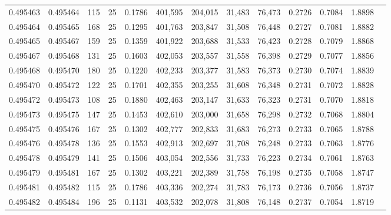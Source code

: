 \begin{tabular}{rrrrrrrrrrrrr}
0.495463 & 0.495464 &   115 &  25 &                                     0.1786 & 401,595 & 204,015 &  31,483 &  76,473 & 0.2726 & 0.7084 & 1.8898 \\
0.495464 & 0.495465 &   168 &  25 &                                     0.1295 & 401,763 & 203,847 &  31,508 &  76,448 & 0.2727 & 0.7081 & 1.8882 \\
0.495465 & 0.495467 &   159 &  25 &                                     0.1359 & 401,922 & 203,688 &  31,533 &  76,423 & 0.2728 & 0.7079 & 1.8868 \\
0.495467 & 0.495468 &   131 &  25 &                                     0.1603 & 402,053 & 203,557 &  31,558 &  76,398 & 0.2729 & 0.7077 & 1.8856 \\
0.495468 & 0.495470 &   180 &  25 &                                     0.1220 & 402,233 & 203,377 &  31,583 &  76,373 & 0.2730 & 0.7074 & 1.8839 \\
0.495470 & 0.495472 &   122 &  25 &                                     0.1701 & 402,355 & 203,255 &  31,608 &  76,348 & 0.2731 & 0.7072 & 1.8828 \\
0.495472 & 0.495473 &   108 &  25 &                                     0.1880 & 402,463 & 203,147 &  31,633 &  76,323 & 0.2731 & 0.7070 & 1.8818 \\
0.495473 & 0.495475 &   147 &  25 &                                     0.1453 & 402,610 & 203,000 &  31,658 &  76,298 & 0.2732 & 0.7068 & 1.8804 \\
0.495475 & 0.495476 &   167 &  25 &                                     0.1302 & 402,777 & 202,833 &  31,683 &  76,273 & 0.2733 & 0.7065 & 1.8788 \\
0.495476 & 0.495478 &   136 &  25 &                                     0.1553 & 402,913 & 202,697 &  31,708 &  76,248 & 0.2733 & 0.7063 & 1.8776 \\
0.495478 & 0.495479 &   141 &  25 &                                     0.1506 & 403,054 & 202,556 &  31,733 &  76,223 & 0.2734 & 0.7061 & 1.8763 \\
0.495479 & 0.495481 &   167 &  25 &                                     0.1302 & 403,221 & 202,389 &  31,758 &  76,198 & 0.2735 & 0.7058 & 1.8747 \\
0.495481 & 0.495482 &   115 &  25 &                                     0.1786 & 403,336 & 202,274 &  31,783 &  76,173 & 0.2736 & 0.7056 & 1.8737 \\
0.495482 & 0.495484 &   196 &  25 &                                     0.1131 & 403,532 & 202,078 &  31,808 &  76,148 & 0.2737 & 0.7054 & 1.8719 \\

\end{tabular}
